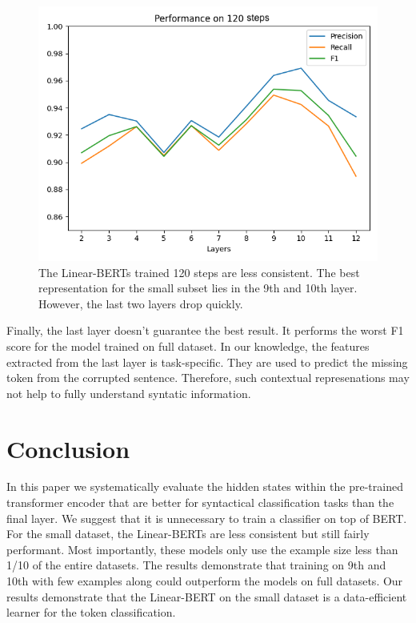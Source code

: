 \documentclass[11pt,a4paper]{article}
\begin{document}
 
\begin{figure}
\begin{center}
  \includegraphics[width=\linewidth]{f1-120.png}
  \caption{\label{fig:f1-120}The Linear-BERTs trained 120 steps are less consistent. The best representation for the small subset lies in the 9th and 10th layer. However, the last two layers drop quickly.}
\end{center}
\end{figure}

Finally, the last layer doesn't guarantee the best result. It performs the worst F1 score for the model trained on full dataset. In our knowledge, the features extracted from the last layer is task-specific. They are used to predict the missing token from the corrupted sentence. Therefore, such contextual represenations may not help to fully understand syntatic information.

\section{Conclusion}

In this paper we systematically evaluate the hidden states within the pre-trained transformer encoder that are better for syntactical classification tasks than the final layer. We suggest that it is unnecessary to train a classifier on top of BERT. For the small dataset, the Linear-BERTs are less consistent but still fairly performant. Most importantly, these models only use the example size less than 1/10 of the entire datasets. The results demonstrate that training on 9th and 10th with few examples along could outperform the models on full datasets. Our results demonstrate that the Linear-BERT on the small dataset is a data-efficient learner for the token classification.
\end{document}
